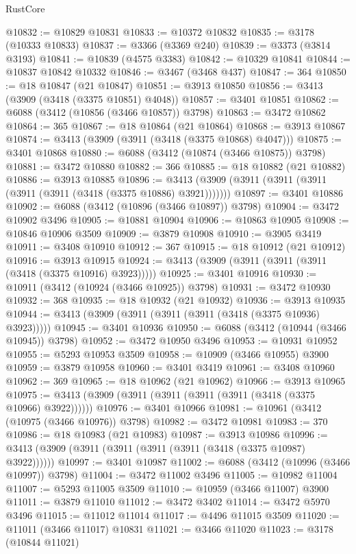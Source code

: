 \begin{lexlean}{RustCore}
\begin{coremodule}
@10832 := @10829 @10831
@10833 := @10372 @10832
@10835 := @3178 (@10333 @10833)
@10837 := @3366 (@3369 @240)
@10839 := @3373 (@3814 @3193)
@10841 := @10839 (@4575 @3383)
@10842 := @10329 @10841
@10844 := @10837 @10842 @10332
@10846 := @3467 (@3468 @437)
@10847 := 364
@10850 := @18 @10847 (@21 @10847)
@10851 := @3913 @10850
@10856 := @3413 (@3909 (@3418 (@3375 @10851) @4048))
@10857 := @3401 @10851
@10862 := @6088 (@3412 (@10856 (@3466 @10857)) @3798)
@10863 := @3472 @10862
@10864 := 365
@10867 := @18 @10864 (@21 @10864)
@10868 := @3913 @10867
@10874 := @3413 (@3909 (@3911 (@3418 (@3375 @10868) @4047)))
@10875 := @3401 @10868
@10880 := @6088 (@3412 (@10874 (@3466 @10875)) @3798)
@10881 := @3472 @10880
@10882 := 366
@10885 := @18 @10882 (@21 @10882)
@10886 := @3913 @10885
@10896 := @3413 (@3909 (@3911 (@3911 (@3911 (@3911 (@3911 (@3418 (@3375 @10886) @3921)))))))
@10897 := @3401 @10886
@10902 := @6088 (@3412 (@10896 (@3466 @10897)) @3798)
@10904 := @3472 @10902 @3496
@10905 := @10881 @10904
@10906 := @10863 @10905
@10908 := @10846 @10906 @3509
@10909 := @3879 @10908
@10910 := @3905 @3419
@10911 := @3408 @10910
@10912 := 367
@10915 := @18 @10912 (@21 @10912)
@10916 := @3913 @10915
@10924 := @3413 (@3909 (@3911 (@3911 (@3911 (@3418 (@3375 @10916) @3923)))))
@10925 := @3401 @10916
@10930 := @10911 (@3412 (@10924 (@3466 @10925)) @3798)
@10931 := @3472 @10930
@10932 := 368
@10935 := @18 @10932 (@21 @10932)
@10936 := @3913 @10935
@10944 := @3413 (@3909 (@3911 (@3911 (@3911 (@3418 (@3375 @10936) @3923)))))
@10945 := @3401 @10936
@10950 := @6088 (@3412 (@10944 (@3466 @10945)) @3798)
@10952 := @3472 @10950 @3496
@10953 := @10931 @10952
@10955 := @5293 @10953 @3509
@10958 := @10909 (@3466 @10955) @3900
@10959 := @3879 @10958
@10960 := @3401 @3419
@10961 := @3408 @10960
@10962 := 369
@10965 := @18 @10962 (@21 @10962)
@10966 := @3913 @10965
@10975 := @3413 (@3909 (@3911 (@3911 (@3911 (@3911 (@3418 (@3375 @10966) @3922))))))
@10976 := @3401 @10966
@10981 := @10961 (@3412 (@10975 (@3466 @10976)) @3798)
@10982 := @3472 @10981
@10983 := 370
@10986 := @18 @10983 (@21 @10983)
@10987 := @3913 @10986
@10996 := @3413 (@3909 (@3911 (@3911 (@3911 (@3911 (@3418 (@3375 @10987) @3922))))))
@10997 := @3401 @10987
@11002 := @6088 (@3412 (@10996 (@3466 @10997)) @3798)
@11004 := @3472 @11002 @3496
@11005 := @10982 @11004
@11007 := @5293 @11005 @3509
@11010 := @10959 (@3466 @11007) @3900
@11011 := @3879 @11010
@11012 := @3472 @3402
@11014 := @3472 @5970 @3496
@11015 := @11012 @11014
@11017 := @4496 @11015 @3509
@11020 := @11011 (@3466 @11017) @10831
@11021 := @3466 @11020
@11023 := @3178 (@10844 @11021)

\end{coremodule}
\end{lexlean}
